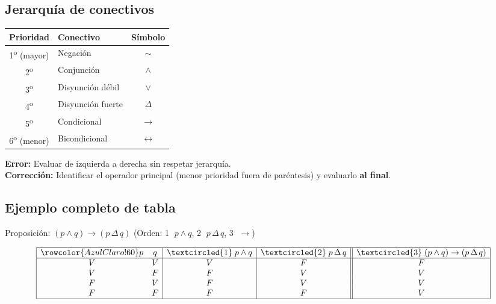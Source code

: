 	\subsection{Jerarquía de conectivos}
	
	\begin{cajaformula}
		\begin{center}
			\renewcommand{\arraystretch}{1.4}
			\begin{tabular}{@{}clc@{}}
				\toprule
				\rowcolor{AzulClaro!60}
				\textbf{Prioridad} & \textbf{Conectivo} & \textbf{Símbolo} \\
				\midrule
				1\textsuperscript{o} (mayor) & Negación         & $\sim$            \\
				\rowcolor{GrisClaro}
				2\textsuperscript{o}          & Conjunción       & $\wedge$          \\
				3\textsuperscript{o}          & Disyunción débil & $\vee$            \\
				\rowcolor{GrisClaro}
				4\textsuperscript{o}          & Disyunción fuerte& $\Delta$          \\
				5\textsuperscript{o}          & Condicional      & $\to$             \\
				\rowcolor{GrisClaro}
				6\textsuperscript{o} (menor)  & Bicondicional    & $\leftrightarrow$ \\
				\bottomrule
			\end{tabular}
		\end{center}
	\end{cajaformula}
	
	\begin{cajaadvert}
		\textbf{Error:} Evaluar de izquierda a derecha sin respetar jerarquía.\\
		\textbf{Corrección:} Identificar el operador principal (menor prioridad fuera
		de paréntesis) y evaluarlo \textbf{al final}.
	\end{cajaadvert}
	
	\subsection{Ejemplo completo de tabla}
	
	Proposición: $(p \wedge q) \to (p \,\Delta\, q)$ \quad
	(Orden: \textcircled{1} $p \wedge q$, \textcircled{2} $p\,\Delta\,q$,
	\textcircled{3} $\to$)
	
	\[
	\begin{array}{|cc|c|c||c|}
		\hline
		\rowcolor{AzulClaro!60}
		p & q & \textcircled{1}\;p \wedge q & \textcircled{2}\;p\,\Delta\,q
		& \textcircled{3}\;(p \wedge q) \to (p\,\Delta\,q) \\
		\hline
		V & V & V & F & F \\
		V & F & F & V & V \\
		F & V & F & V & V \\
		F & F & F & F & V \\
		\hline
	\end{array}
	\]
	
